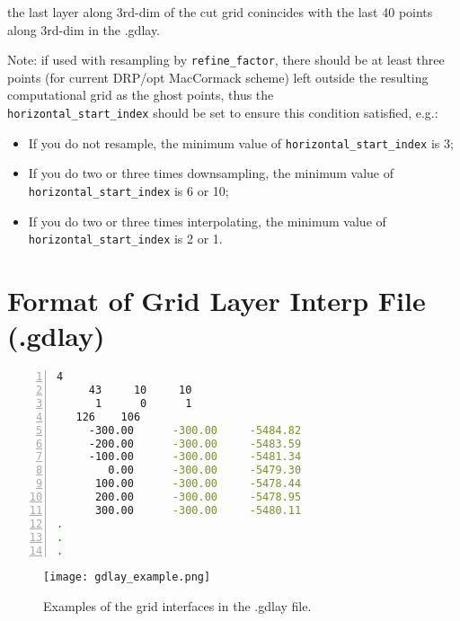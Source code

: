\begin{itemize}
\begin{itemize}
          the last layer along 3rd-dim of the cut grid conincides with 
            the last 40 points along 3rd-dim in the .gdlay.
    \end{itemize}
    Note: if used with resampling by \verb|refine_factor|,
      there should be at least three points (for current DRP/opt MacCormack scheme) left
          outside the resulting computational grid as the ghost points,
          thus the \\
          \verb|horizontal_start_index| should be set to ensure this condition satisfied, e.g.:
    \begin{itemize}
      \item If you do not resample, the minimum value of \verb|horizontal_start_index| is 3;
      \item If you do two or three times  downsampling,
          the minimum value of \verb|horizontal_start_index| is 6 or 10;
      \item If you do two or three times interpolating,
        the minimum value of \verb|horizontal_start_index| is 2 or 1.
    \end{itemize}
\end{itemize}


\section{Format of Grid Layer Interp File (.gdlay)} \label{gridlayerinterp}

\begin{lstlisting}[language=bash,
    numbers=left, numbersep=5pt,numberstyle=\tiny\color{codegray},
    commentstyle=\color{codegreen},
    caption={Example of .gdlay file},
    label={lst_grid_gdlay},
    frame=tb]
     4
     43     10     10
      1      0      1
   126    106
     -300.00      -300.00     -5484.82
     -200.00      -300.00     -5483.59
     -100.00      -300.00     -5481.34
        0.00      -300.00     -5479.30
      100.00      -300.00     -5478.44
      200.00      -300.00     -5478.95
      300.00      -300.00     -5480.11
.
.
.
\end{lstlisting}

\begin{figure}
    \centering
    \texttt{[image: gdlay\_example.png]}
    \caption{Examples of the grid interfaces in the .gdlay file.}
    \label{fig_gdlay}
\end{figure}


